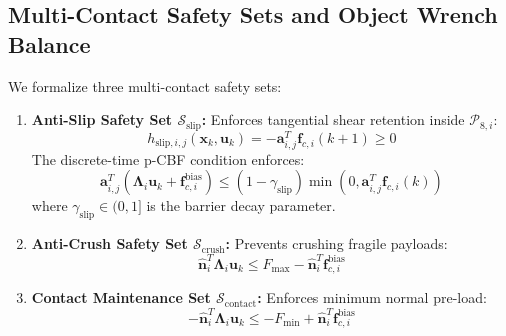 \subsection{Multi-Contact Safety Sets and Object Wrench Balance}
We formalize three multi-contact safety sets:
\begin{enumerate}
    \item \textbf{Anti-Slip Safety Set $\mathcal{S}_{\text{slip}}$:} Enforces tangential shear retention inside $\mathcal{P}_{8, i}$:
    \begin{equation}
        h_{\text{slip}, i, j}(\mathbf{x}_k, \mathbf{u}_k) = -\mathbf{a}_{i, j}^T \mathbf{f}_{c, i}(k+1) \ge 0
    \end{equation}
    The discrete-time p-CBF condition enforces:
    \begin{equation}
        \mathbf{a}_{i, j}^T \left( \mathbf{\Lambda}_i \mathbf{u}_k + \mathbf{f}_{c, i}^{\text{bias}} \right) \le (1 - \gamma_{\text{slip}}) \min\left(0, \mathbf{a}_{i, j}^T \mathbf{f}_{c, i}(k)\right)
        \label{eq:slip_cbf}
    \end{equation}
    where $\gamma_{\text{slip}} \in (0, 1]$ is the barrier decay parameter.
    \item \textbf{Anti-Crush Safety Set $\mathcal{S}_{\text{crush}}$:} Prevents crushing fragile payloads:
    \begin{equation}
        \hat{\mathbf{n}}_i^T \mathbf{\Lambda}_i \mathbf{u}_k \le F_{\max} - \hat{\mathbf{n}}_i^T \mathbf{f}_{c, i}^{\text{bias}}
        \label{eq:crush_cbf}
    \end{equation}
    \item \textbf{Contact Maintenance Set $\mathcal{S}_{\text{contact}}$:} Enforces minimum normal pre-load:
    \begin{equation}
        -\hat{\mathbf{n}}_i^T \mathbf{\Lambda}_i \mathbf{u}_k \le -F_{\min} + \hat{\mathbf{n}}_i^T \mathbf{f}_{c, i}^{\text{bias}}
        \label{eq:contact_cbf}
    \end{equation}
\end{enumerate}

